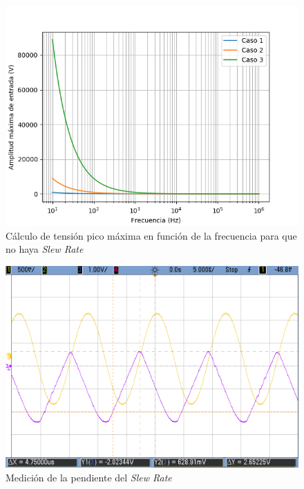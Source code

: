 \begin{figure}[H]
\begin{centering}
\includegraphics[scale=0.5]{../Ex1/iA/Resources1a/SlewRate123}
\par\end{centering}
\caption{Cálculo de tensión pico máxima en función de la frecuencia para que
no haya \emph{Slew Rate}}
\label{1_a_18}

\end{figure}

\begin{figure}[H]
\begin{centering}
\includegraphics[scale=0.3]{../Ex1/iA/Resources1a/slewRatemed}
\par\end{centering}
\caption{Medición de la pendiente del \emph{Slew Rate}}
\label{1_a_13}

\end{figure}

